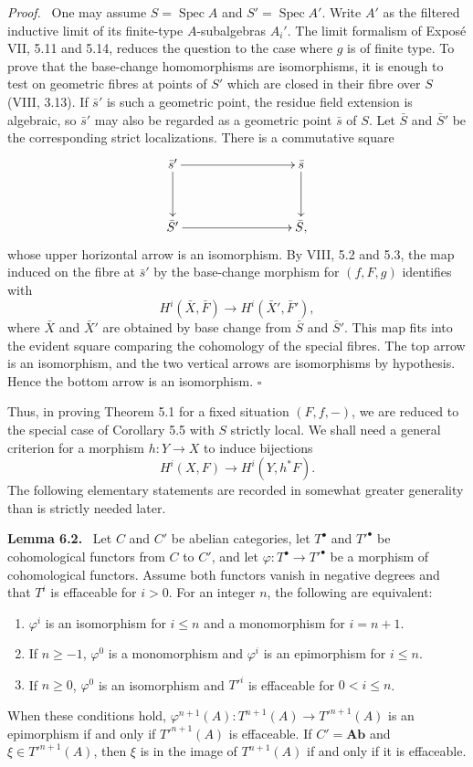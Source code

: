 \documentclass[12pt]{article}
\newcommand{\Spec}{\operatorname{Spec}}
\newcommand{\qedtext}{\hfill\(\square\)}
\newenvironment{statement}[1]{\par\medskip\noindent\textbf{#1.}\ }{\par\medskip}
\newenvironment{prooftext}[1][Proof]{\par\noindent\emph{#1.}\ }{\par\medskip}
\begin{document}
\begin{prooftext}
One may assume \(S=\Spec A\) and \(S'=\Spec A'\). Write \(A'\) as the filtered inductive limit of its finite-type \(A\)-subalgebras \(A_i'\). The limit formalism of Expos\'e VII, 5.11 and 5.14, reduces the question to the case where \(g\) is of finite type. To prove that the base-change homomorphisms are isomorphisms, it is enough to test on geometric fibres at points of \(S'\) which are closed in their fibre over \(S\) (VIII, 3.13). If \(\bar s'\) is such a geometric point, the residue field extension is algebraic, so \(\bar s'\) may also be regarded as a geometric point \(\bar s\) of \(S\). Let \(\bar S\) and \(\bar S'\) be the corresponding strict localizations. There is a commutative square
\[
\xymatrix@C=3cm@R=1.2cm{
\bar s'\ar[r]\ar[d]&\bar s\ar[d]\\
\bar S'\ar[r]&\bar S,
}
\]
whose upper horizontal arrow is an isomorphism. By VIII, 5.2 and 5.3, the map induced on the fibre at \(\bar s'\) by the base-change morphism for \((f,F,g)\) identifies with
\[
H^i(\bar X,\bar F)\longrightarrow H^i(\bar X',\bar F'),
\]
where \(\bar X\) and \(\bar X'\) are obtained by base change from \(\bar S\) and \(\bar S'\). This map fits into the evident square comparing the cohomology of the special fibres. The top arrow is an isomorphism, and the two vertical arrows are isomorphisms by hypothesis. Hence the bottom arrow is an isomorphism. \qedtext
\end{prooftext}

Thus, in proving Theorem 5.1 for a fixed situation \((F,f,-)\), we are reduced to the special case of Corollary 5.5 with \(S\) strictly local. We shall need a general criterion for a morphism \(h:Y\to X\) to induce bijections
\[
H^i(X,F)\longrightarrow H^i(Y,h^*F).
\]
The following elementary statements are recorded in somewhat greater generality than is strictly needed later.

\begin{statement}{Lemma 6.2}
Let \(C\) and \(C'\) be abelian categories, let \(T^\bullet\) and \({T'}^\bullet\) be cohomological functors from \(C\) to \(C'\), and let \(\varphi:T^\bullet\to {T'}^\bullet\) be a morphism of cohomological functors. Assume both functors vanish in negative degrees and that \(T^i\) is effaceable for \(i>0\). For an integer \(n\), the following are equivalent:
\begin{enumerate}[label=\alph*)]
\item \(\varphi^i\) is an isomorphism for \(i\le n\) and a monomorphism for \(i=n+1\).
\item If \(n\ge -1\), \(\varphi^0\) is a monomorphism and \(\varphi^i\) is an epimorphism for \(i\le n\).
\item If \(n\ge0\), \(\varphi^0\) is an isomorphism and \({T'}^i\) is effaceable for \(0<i\le n\).
\end{enumerate}
When these conditions hold, \(\varphi^{n+1}(A):T^{n+1}(A)\to {T'}^{n+1}(A)\) is an epimorphism if and only if \({T'}^{n+1}(A)\) is effaceable. If \(C'=\mathbf{Ab}\) and \(\xi\in {T'}^{n+1}(A)\), then \(\xi\) is in the image of \(T^{n+1}(A)\) if and only if it is effaceable.
\end{statement}
\end{document}
